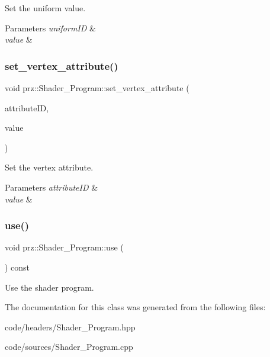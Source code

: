 Set the uniform value. 


\begin{DoxyParams}{Parameters}
{\em uniform\+ID} & \\
\hline
{\em value} & \\
\hline
\end{DoxyParams}
\mbox{\label{classprz_1_1_shader___program_ab82a2f5de5de8a1031ff3c59b48e917f}} 
\subsubsection{\texorpdfstring{set\_vertex\_attribute()}{set\_vertex\_attribute()}}
{\footnotesize\ttfamily void prz\+::\+Shader\+\_\+\+Program\+::set\+\_\+vertex\+\_\+attribute (\begin{DoxyParamCaption}\item[{G\+Lint}]{attribute\+ID,  }\item[{const float \&}]{value }\end{DoxyParamCaption})\hspace{0.3cm}{\ttfamily [inline]}}



Set the vertex attribute. 


\begin{DoxyParams}{Parameters}
{\em attribute\+ID} & \\
\hline
{\em value} & \\
\hline
\end{DoxyParams}
\mbox{\label{classprz_1_1_shader___program_a7d77b91c272c02c6c4cf017c7d957305}} 
\subsubsection{\texorpdfstring{use()}{use()}}
{\footnotesize\ttfamily void prz\+::\+Shader\+\_\+\+Program\+::use (\begin{DoxyParamCaption}{ }\end{DoxyParamCaption}) const\hspace{0.3cm}{\ttfamily [inline]}}



Use the shader program. 



The documentation for this class was generated from the following files\+:\begin{DoxyCompactItemize}
\item 
code/headers/Shader\+\_\+\+Program.\+hpp\item 
code/sources/Shader\+\_\+\+Program.\+cpp\end{DoxyCompactItemize}
